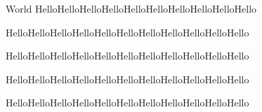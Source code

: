 \documentclass{myarticle}
\begin{document}
\begin{section}{World}
HelloHelloHelloHelloHelloHelloHelloHelloHelloHello

HelloHelloHelloHelloHelloHelloHelloHelloHelloHelloHello

HelloHelloHelloHelloHelloHelloHelloHelloHelloHelloHello

HelloHelloHelloHelloHelloHelloHelloHelloHelloHelloHello

HelloHelloHelloHelloHelloHelloHelloHelloHelloHelloHello


\end{section}
\end{document}
